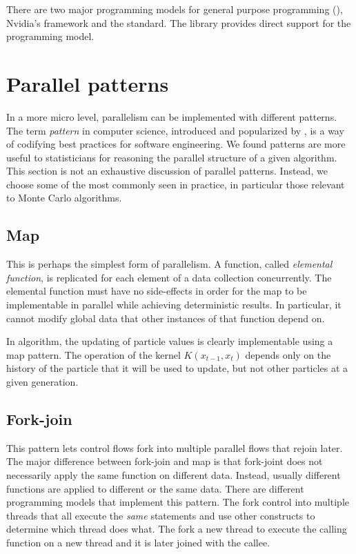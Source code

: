 There are two major programming models for general purpose \gpu programming (\gpgpu), Nvidia's \cuda framework and the \opencl \cite{opencl} standard. The \vsmc library provides direct support for the \opencl programming model.

\section{Parallel patterns}
\label{sec:Parallel patterns}

In a more micro level, parallelism can be implemented with different patterns. The term \emph{pattern} in computer science, introduced and popularized by \cite{software:GoF}, is a way of codifying best practices for software engineering. We found patterns are more useful to statisticians for reasoning the parallel structure of a given algorithm. This section is not an exhaustive discussion of parallel patterns. Instead, we choose some of the most commonly seen in practice, in particular those relevant to Monte Carlo algorithms.

\subsection{Map}
\label{sub:Map}

This is perhaps the simplest form of parallelism. A function, called \emph{elemental function}, is replicated for each element of a data collection concurrently. The elemental function must have no side-effects in order for the map to be implementable in parallel while achieving deterministic results. In particular, it cannot modify global data that other instances of that function depend on.

In \smc algorithm, the updating of particle values is clearly implementable using a map pattern. The operation of the kernel $K(x_{t-1},x_t)$ depends only on the history of the particle that it will be used to update, but not other particles at a given generation.

\subsection{Fork-join}
\label{sub:Fork-join}

This pattern lets control flows fork into multiple parallel flows that rejoin later. The major difference between fork-join and map is that fork-joint does not necessarily apply the same function on different data. Instead, usually different functions are applied to different or the same data. There are different programming models that implement this pattern. The \openmp {} fork control into multiple threads that all execute the \emph{same} statements and use other constructs to determine which thread does what. The \cilk \cite{cilk}  fork a new thread to execute the calling function on a new thread and it is later joined with the callee.

